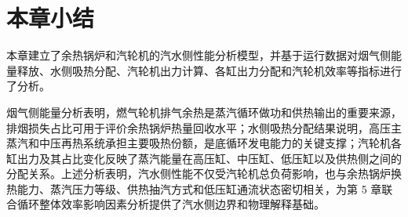 \FloatBarrier

\section{本章小结}

本章建立了余热锅炉和汽轮机的汽水侧性能分析模型，并基于运行数据对烟气侧能量释放、水侧吸热分配、汽轮机出力计算、各缸出力分配和汽轮机效率等指标进行了分析。

烟气侧能量分析表明，燃气轮机排气余热是蒸汽循环做功和供热输出的重要来源，排烟损失占比可用于评价余热锅炉热量回收水平；水侧吸热分配结果说明，高压主蒸汽和中压再热系统承担主要吸热份额，是底循环发电能力的关键支撑；汽轮机各缸出力及其占比变化反映了蒸汽能量在高压缸、中压缸、低压缸以及供热侧之间的分配关系。上述分析表明，汽水侧性能不仅受汽轮机总负荷影响，也与余热锅炉换热能力、蒸汽压力等级、供热抽汽方式和低压缸通流状态密切相关，为第 5 章联合循环整体效率影响因素分析提供了汽水侧边界和物理解释基础。

